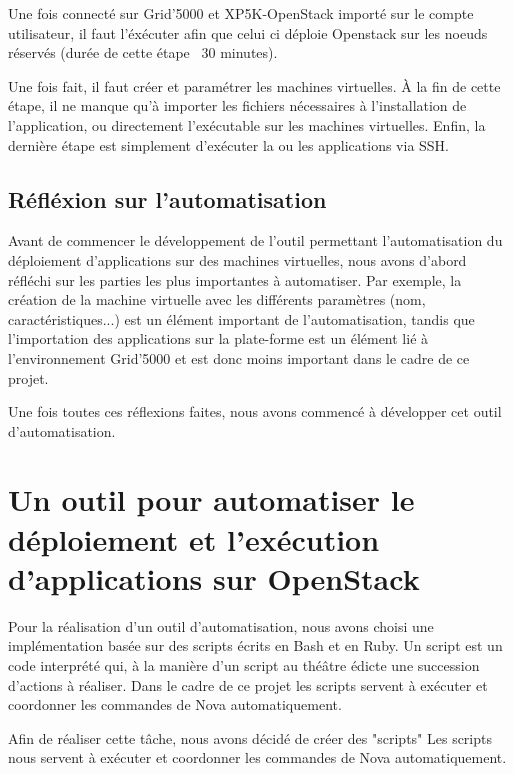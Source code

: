 \documentclass{report}
\begin{document}
Une fois connecté sur Grid'5000 et XP5K-OpenStack importé sur le compte utilisateur, il faut l'éxécuter afin que celui ci déploie Openstack sur les noeuds réservés (durée de cette étape ~30 minutes).\bigbreak

Une fois fait, il faut créer et paramétrer les machines virtuelles. À la fin de cette étape, il ne manque qu'à importer les fichiers nécessaires à l'installation de l'application, ou directement l'exécutable sur les machines virtuelles. 
Enfin, la dernière étape est simplement d'exécuter la ou les applications via SSH.

    \section{Réfléxion sur l'automatisation}
    Avant de commencer le développement de l'outil permettant l'automatisation du déploiement d'applications sur des machines virtuelles, nous avons d'abord réfléchi sur les parties les plus importantes à automatiser. Par exemple, la création de la machine virtuelle avec les différents paramètres (nom, caractéristiques...) est un élément important de l'automatisation, tandis que l'importation des applications sur la plate-forme est un élément lié à l'environnement Grid'5000 et est donc moins important dans le cadre de ce projet.\bigbreak
    
    Une fois toutes ces réflexions faites, nous avons commencé à développer cet outil d'automatisation.



\chapter{Un outil pour automatiser le déploiement et l'exécution d'applications sur OpenStack}
    
    Pour la réalisation d'un outil d'automatisation, nous avons choisi une implémentation basée sur des scripts écrits en Bash et en Ruby. Un script est un code interprété qui, à la manière d'un script au théâtre édicte une succession d'actions à réaliser.
    Dans le cadre de ce projet les scripts servent à exécuter et coordonner les commandes de Nova automatiquement.
    
    Afin de réaliser cette tâche, nous avons décidé de créer des "scripts"  Les scripts nous servent à exécuter et coordonner les commandes de Nova automatiquement. 
   
    
\end{document}
